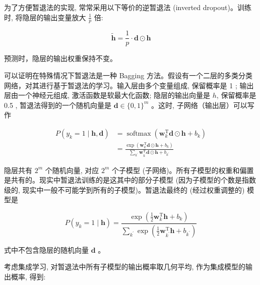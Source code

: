 \documentclass[10pt]{article}
\begin{document}
\begin{CJK*}{UTF8}{bsmi}
为了方便暂退法的实现, 常常采用以下等价的逆暂退法 (inverted dropout)。训练时, 将隐层的输出变量放大 $\frac{1}{p}$ 倍:


\begin{equation*}
\tilde{\boldsymbol{h}}=\frac{1}{p} \cdot \boldsymbol{d} \odot \boldsymbol{h} \tag{23.72}
\end{equation*}


预测时，隐层的输出权重保持不变。

可以证明在特殊情况下暂退法是一种 Bagging 方法。假设有一个二层的多类分类网络，对其进行基于暂退法的学习。输入层由多个变量组成, 保留概率是 1 ; 输出层由一个神经元组成, 激活函数是软最大化函数; 隐层的输出向量是 $h$, 保留概率是 0.5 , 暂退法得到的一个随机向量是 $\boldsymbol{d} \in\{0,1\}^{m}$ 。这时, 子网络（输出层）可以写作


\begin{align*}
P\left(y_{k}=1 \mid \boldsymbol{h}, \boldsymbol{d}\right) & =\operatorname{softmax}\left(\boldsymbol{w}_{k}^{\mathrm{T}} \boldsymbol{d} \odot \boldsymbol{h}+b_{k}\right) \\
& =\frac{\exp \left(\boldsymbol{w}_{k}^{\mathrm{T}} \boldsymbol{d} \odot \boldsymbol{h}+b_{k}\right)}{\sum_{k^{\prime}} \boldsymbol{w}_{k^{\prime}}^{\mathrm{T}} \boldsymbol{d} \odot \boldsymbol{h}+b_{k^{\prime}}} \tag{23.73}
\end{align*}


隐层共有 $2^{m}$ 个随机向量, 对应 $2^{m}$ 个子模型 (子网络)。所有子模型的权重和偏置是共有的。现实中暂退法训练的是这其中的部分子模型 (因为子模型的个数是指数级的, 现实中一般不可能学到所有的子模型)。暂退法最终的 (经过权重调整的) 模型是


\begin{equation*}
P\left(y_{k}=1 \mid \boldsymbol{h}\right)=\frac{\exp \left(\frac{1}{2} \boldsymbol{w}_{k}^{\mathrm{T}} \boldsymbol{h}+b_{k}\right)}{\sum_{k^{\prime}} \exp \left(\frac{1}{2} \boldsymbol{w}_{k^{\prime}}^{\mathrm{T}} \boldsymbol{h}+b_{k^{\prime}}\right)} \tag{23.74}
\end{equation*}


式中不包含隐层的随机向量 $\boldsymbol{d}$ 。

考虑集成学习, 对暂退法中所有子模型的输出概率取几何平均, 作为集成模型的输出概率, 得到:



\end{CJK*}
\end{document}
